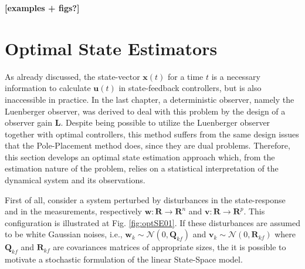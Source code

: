 \documentclass[a4paper,11pt]{book}
\numberwithin{figure}{chapter}
\numberwithin{equation}{chapter}
\numberwithin{table}{chapter}
\theoremstyle{definition}
\begin{document}
\textbf{[examples + figs?]}

\section{Optimal State Estimators}

As already discussed, the state-vector $\bm{x}(t)$ for a time $t$ is a necessary information to calculate $\bm{u}(t)$ in state-feedback controllers, but is also inaccessible in practice. In the last chapter, a deterministic observer, namely the Luenberger observer, was derived to deal with this problem by the design of a observer gain $\bm{L}$. Despite being possible to utilize the Luenberger observer together with optimal controllers, this method suffers from the same design issues that the Pole-Placement method does, since they are dual problems. Therefore, this section develops an optimal state estimation approach which, from the estimation nature of the problem, relies on a statistical interpretation of the dynamical system and its observations.

First of all, consider a system perturbed by disturbances in the state-response and in the measurements, respectively $\bm{w} : \bm{R} \rightarrow \bm{R}^{n}$ and $\bm{v} : \bm{R} \rightarrow \bm{R}^{p}$. This configuration is illustrated at Fig. \ref{fig:optSE01}. If these disturbances are assumed to be white Gaussian noises, i.e., $\bm{w}_k \sim \mathcal{N}(0, \bm{Q}_{kf})$ and $\bm{v}_k \sim \mathcal{N}(0, \bm{R}_{kf})$ where $\bm{Q}_{kf}$ and $\bm{R}_{kf}$ are covariances matrices of appropriate sizes, the it is possible to motivate a stochastic formulation of the linear State-Space model.
\end{document}
